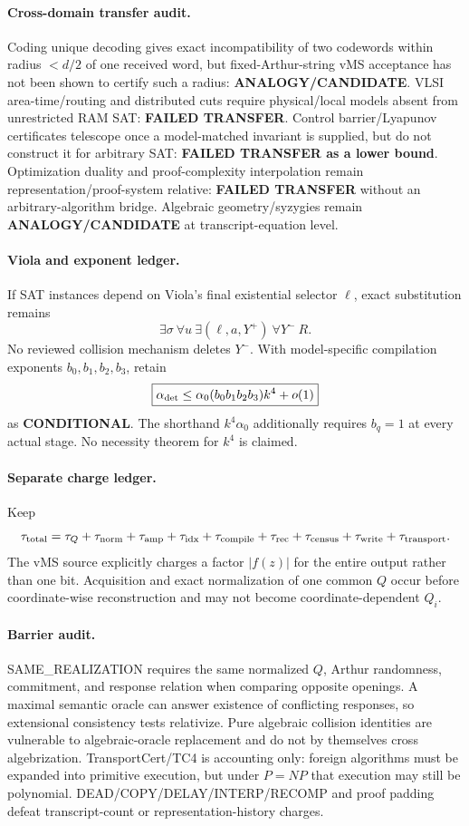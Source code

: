 \documentclass[11pt]{article}
\begin{document}
\paragraph{Cross-domain transfer audit.}
Coding unique decoding gives exact incompatibility of two codewords within radius $<d/2$ of one received word, but fixed-Arthur-string vMS acceptance has not been shown to certify such a radius: \textbf{ANALOGY/CANDIDATE}. VLSI area-time/routing and distributed cuts require physical/local models absent from unrestricted RAM SAT: \textbf{FAILED TRANSFER}. Control barrier/Lyapunov certificates telescope once a model-matched invariant is supplied, but do not construct it for arbitrary SAT: \textbf{FAILED TRANSFER as a lower bound}. Optimization duality and proof-complexity interpolation remain representation/proof-system relative: \textbf{FAILED TRANSFER} without an arbitrary-algorithm bridge. Algebraic geometry/syzygies remain \textbf{ANALOGY/CANDIDATE} at transcript-equation level.

\paragraph{Viola and exponent ledger.}
If SAT instances depend on Viola's final existential selector $\ell$, exact substitution remains
\[
\exists\sigma\ \forall u\ \exists(\ell,a,Y^+)\ \forall Y^-\ R.
\]
No reviewed collision mechanism deletes $Y^-$. With model-specific compilation exponents $b_0,b_1,b_2,b_3$, retain
\[
\boxed{\alpha_{\rm det}\le\alpha_0(b_0b_1b_2b_3)k^4+o(1)}
\]
as \textbf{CONDITIONAL}. The shorthand $k^4\alpha_0$ additionally requires $b_q=1$ at every actual stage. No necessity theorem for $k^4$ is claimed.

\paragraph{Separate charge ledger.}
Keep
\[
\tau_{\rm total}=\tau_Q+\tau_{\rm norm}+\tau_{\rm amp}+\tau_{\rm idx}+\tau_{\rm compile}+\tau_{\rm rec}+\tau_{\rm census}+\tau_{\rm write}+\tau_{\rm transport}.
\]
The vMS source explicitly charges a factor $|f(z)|$ for the entire output rather than one bit. Acquisition and exact normalization of one common $Q$ occur before coordinate-wise reconstruction and may not become coordinate-dependent $Q_i$.

\paragraph{Barrier audit.}
SAME\_REALIZATION requires the same normalized $Q$, Arthur randomness, commitment, and response relation when comparing opposite openings. A maximal semantic oracle can answer existence of conflicting responses, so extensional consistency tests relativize. Pure algebraic collision identities are vulnerable to algebraic-oracle replacement and do not by themselves cross algebrization. TransportCert/TC4 is accounting only: foreign algorithms must be expanded into primitive execution, but under $P=NP$ that execution may still be polynomial. DEAD/COPY/DELAY/INTERP/RECOMP and proof padding defeat transcript-count or representation-history charges.
\end{document}
